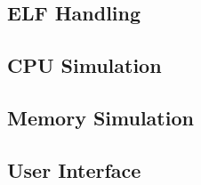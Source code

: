 \documentclass[letterpaper, 11pt, twoside]{article}
\begin{document}
\paragraph{}


\subsection{ELF Handling}
\paragraph{} 

\subsection{CPU Simulation}
\paragraph{}

\subsection{Memory Simulation}
\paragraph{}

\subsection{User Interface}
\paragraph{}

\end{document}
